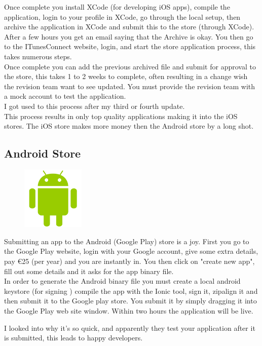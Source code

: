 Once complete you install XCode (for developing iOS apps), compile the application, login to your profile in XCode, go through the local setup, then archive the application in XCode and submit this to the store (through XCode). After a few hours you get an email saying that the Archive is okay. You then go to the ITunesConnect website, login, and start the store application process, this takes numerous steps.
\\
Once complete you can add the previous archived file and submit for approval to the store, this takes 1 to 2 weeks to complete, often resulting in a change wish the revision team want to see updated. You must provide the revision team with a mock account to test the application.
\\
I got used to this process after my third or fourth update.
\\
This process results in only top quality applications making it into the iOS stores.
The iOS store makes more money then the Android store by a long shot.

\subsection{Android Store}
\begin{figure}
	\includegraphics[width=3cm]{img/mobile-app/logos/android.png}
\end{figure} 
Submitting an app to the Android \cite{android} (Google Play) store is a joy.
First you go to the Google Play website, login with your Google account, give some extra details, pay €25 (per year) and you are instantly in.
You then click on "create new app", fill out some details and it asks for the app binary file.
\\
In order to generate the Android binary file you must create a local android keystore (for signing ) compile the app with the Ionic tool, sign it, zipalign it and then submit it to the Google play store.
You submit it by simply dragging it into the Google Play web site window. Within two hours the application will be live.

I looked into why it's so quick, and apparently they test your application after it is submitted, this leads to happy developers.

